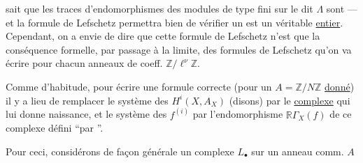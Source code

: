sait que les traces d'endomorphismes des modules de type fini sur le dit $\Lambda$ sont  --- et la formule de Lefschetz \unsure{(*)} permettra bien de vérifier un   est un véritable \uline{entier}. Cependant, on a envie de dire que cette formule de Lefschetz n'est que la conséquence formelle, par passage à la limite, des formules de Lefschetz qu'on va écrire pour chacun  anneaux de coeff. $\mathbb Z/\ell^\nu\mathbb Z$.

Comme d'habitude, pour écrire une formule correcte (pour un $A=\mathbb Z/N\mathbb Z$ \uline{donné}) il y a lieu de remplacer le système des $H^i(X,A_X)$ (disons) par le \uline{complexe}  qui lui donne naissance, et le système des $f^{(i)}$ par l'endomorphisme $\mathbb R\Gamma_X(f)$ de ce complexe défini ``par ''.


Pour ceci, considérons de façon générale un complexe $L_\bullet$ sur un anneau comm. $A$
